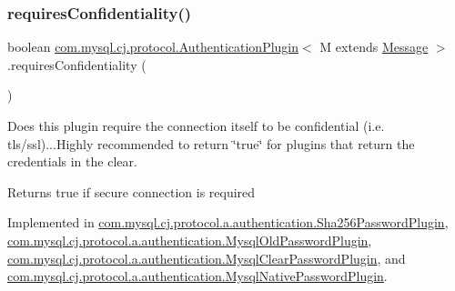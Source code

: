 \subsubsection{\texorpdfstring{requires\+Confidentiality()}{requiresConfidentiality()}}
{\footnotesize\ttfamily boolean \mbox{\hyperlink{interfacecom_1_1mysql_1_1cj_1_1protocol_1_1_authentication_plugin}{com.\+mysql.\+cj.\+protocol.\+Authentication\+Plugin}}$<$ M extends \mbox{\hyperlink{interfacecom_1_1mysql_1_1cj_1_1protocol_1_1_message}{Message}} $>$.requires\+Confidentiality (\begin{DoxyParamCaption}{ }\end{DoxyParamCaption})}

Does this plugin require the connection itself to be confidential (i.\+e. tls/ssl)...Highly recommended to return \char`\"{}true\char`\"{} for plugins that return the credentials in the clear.

\begin{DoxyReturn}{Returns}
true if secure connection is required 
\end{DoxyReturn}


Implemented in \mbox{\hyperlink{classcom_1_1mysql_1_1cj_1_1protocol_1_1a_1_1authentication_1_1_sha256_password_plugin_a13372ce1bdd725d30b81b938202e5cdc}{com.\+mysql.\+cj.\+protocol.\+a.\+authentication.\+Sha256\+Password\+Plugin}}, \mbox{\hyperlink{classcom_1_1mysql_1_1cj_1_1protocol_1_1a_1_1authentication_1_1_mysql_old_password_plugin_a651b0a7b0418bdc2ed5c000da1046d9c}{com.\+mysql.\+cj.\+protocol.\+a.\+authentication.\+Mysql\+Old\+Password\+Plugin}}, \mbox{\hyperlink{classcom_1_1mysql_1_1cj_1_1protocol_1_1a_1_1authentication_1_1_mysql_clear_password_plugin_a3e8370e46183b941e2fc6d72f06a37a1}{com.\+mysql.\+cj.\+protocol.\+a.\+authentication.\+Mysql\+Clear\+Password\+Plugin}}, and \mbox{\hyperlink{classcom_1_1mysql_1_1cj_1_1protocol_1_1a_1_1authentication_1_1_mysql_native_password_plugin_afec5c68644de44be777a78a96e1fabd7}{com.\+mysql.\+cj.\+protocol.\+a.\+authentication.\+Mysql\+Native\+Password\+Plugin}}.

\mbox{\label{interfacecom_1_1mysql_1_1cj_1_1protocol_1_1_authentication_plugin_a504193fb759e76fedc7ca7b00effb44d}} 
